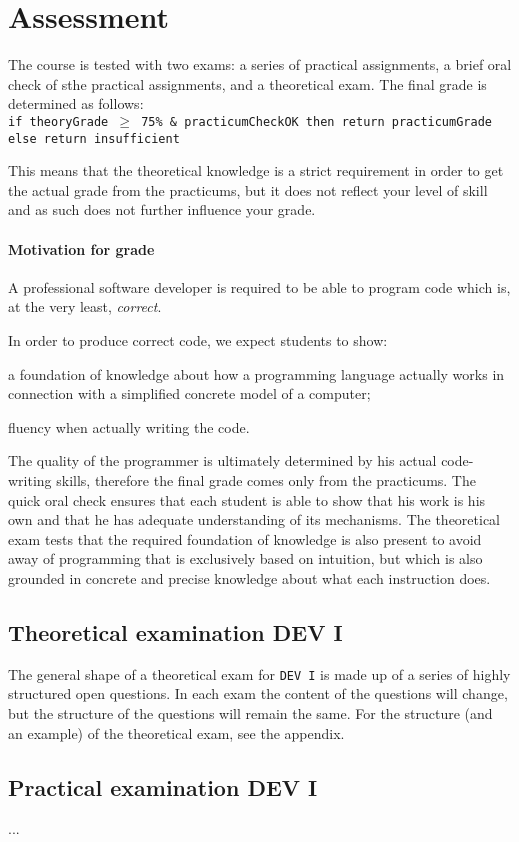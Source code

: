 \section{Assessment}
The course is tested with two exams: a series of practical assignments, a brief oral check of sthe practical assignments, and a theoretical exam. The final grade is determined as follows: \\

\texttt{if theoryGrade $\geq$ 75\% \& practicumCheckOK then return practicumGrade else return insufficient}

This means that the theoretical knowledge is a strict requirement in order to get the actual grade from the practicums, but it does not reflect your level of skill and as such does not further influence your grade.

\paragraph*{Motivation for grade}
A professional software developer is required to be able to program code which is, at the very least, \textit{correct}.

In order to produce correct code, we expect students to show:
\begin{inparaenum}
\item a foundation of knowledge about how a programming language actually works in connection with a simplified concrete model of a computer;
\item fluency when actually writing the code.
\end{inparaenum}

The quality of the programmer is ultimately determined by his actual code-writing skills, therefore the final grade comes only from the practicums. The quick oral check ensures that each student is able to show that his work is his own and that he has adequate understanding of its mechanisms. The theoretical exam tests that the required foundation of knowledge is also present to avoid away of programming that is exclusively based on intuition, but which is also grounded in concrete and precise knowledge about what each instruction does.


\subsection{Theoretical examination DEV I}
The general shape of a theoretical exam for \texttt{DEV I} is made up of a series of highly structured open questions. In each exam the content of the questions will change, but the structure of the questions will remain the same. For the structure (and an example) of the theoretical exam, see the appendix.


\subsection{Practical examination DEV I}
...

